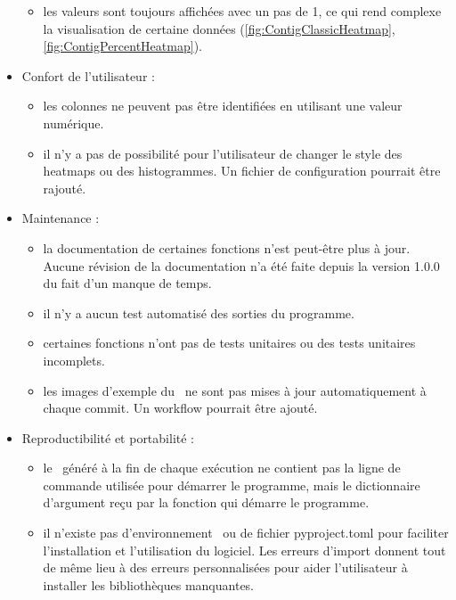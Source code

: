 \documentclass[../main]{subfiles} %
\begin{document}
\begin{itemize}
\begin{itemize}
            \item les valeurs sont toujours affichées avec un pas de 1, ce qui rend complexe la visualisation de certaine données (\cref{fig:ContigClassicHeatmap}, \cref{fig:ContigPercentHeatmap}).
        \end{itemize}

    \item Confort de l'utilisateur :
    \begin{itemize}
        \item les colonnes ne peuvent pas être identifiées en utilisant une valeur numérique.
        
        \item il n'y a pas de possibilité pour l'utilisateur de changer le style des heatmaps ou des histogrammes. Un fichier de configuration pourrait être rajouté.
        
    \end{itemize}

    \item Maintenance :
        \begin{itemize}
          \item la documentation de certaines fonctions n'est peut-être plus à jour. Aucune révision de la documentation n'a été faite depuis la version 1.0.0 du fait d'un manque de temps.
    
        \item il n'y a aucun test automatisé des sorties du programme. 
        
        \item certaines fonctions n'ont pas de tests unitaires ou des tests unitaires incomplets.

        \item les images d'exemple du \readme ne sont pas mises à jour automatiquement à chaque \gls{commit}. Un workflow pourrait être ajouté.

        
    \end{itemize}

\item Reproductibilité et portabilité : 
    \begin{itemize}
        \item le \readme généré à la fin de chaque exécution ne contient pas la ligne de commande utilisée pour démarrer le programme, mais le dictionnaire d'argument reçu par la fonction qui démarre le programme.

        \item il n'existe pas d'environnement \Conda ou de fichier \gls{pyproject.toml} pour faciliter l'installation et l'utilisation du logiciel. Les erreurs d'import donnent tout de même lieu à des erreurs personnalisées pour aider l'utilisateur à installer les bibliothèques manquantes.
    \end{itemize}

\end{itemize}
\end{document}
